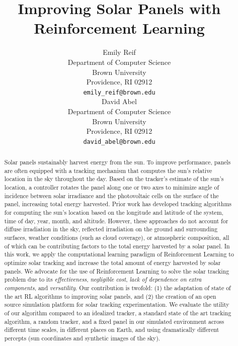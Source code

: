 \documentclass[11pt]{article}
\title{Improving Solar Panels with Reinforcement Learning}
\author{
Emily Reif \\
Department of Computer Science\\
Brown University\\
Providence, RI 02912 \\
\texttt{emily\_reif@brown.edu} \\
\And
David Abel \\
Department of Computer Science\\
Brown University \\
Providence, RI 02912 \\
\texttt{david\_abel@brown.edu} \\
}
\date{}
\begin{document}
\maketitle

\begin{abstract}
Solar panels sustainably harvest energy from the sun. To improve performance, panels are often equipped with a tracking mechanism that computes the sun's relative location in the sky throughout the day. Based on the tracker's estimate of the sun's location, a controller rotates the panel along one or two axes to minimize angle of incidence between solar irradiance and the photovoltaic cells on the surface of the panel, increasing total energy harvested. Prior work has developed tracking algorithms for computing the sun's location based on the longitude and latitude of the system, time of day, year, month, and altitude.
%
However, these approaches do not account for diffuse irradiation in the sky, reflected irradiation on the ground and surrounding surfaces, weather conditions (such as cloud coverage), or atmospheric composition, all of which can be contributing factors to the total energy harvested by a solar panel.
%
In this work, we apply the computational learning paradigm of Reinforcement Learning to optimize solar tracking and increase the total amount of energy harvested by solar panels. We advocate for the use of Reinforcement Learning to solve the solar tracking problem due to its {\it effectiveness}, {\it negligible cost}, {\it lack of dependence on extra components}, and {\it versatility}. Our contribution is twofold: (1) the adaptation of state of the art RL algorithms to improving solar panels, and (2) the creation of an open source simulation platform for solar tracking experimentation. We evaluate the utility of our algorithm compared to an idealized tracker, a standard state of the art tracking algorithm, a random tracker, and a fixed panel in our simulated environment across different time scales, in different places on Earth, and using dramatically different percepts (sun coordinates and synthetic images of the sky).
\end{abstract}

\end{document}

